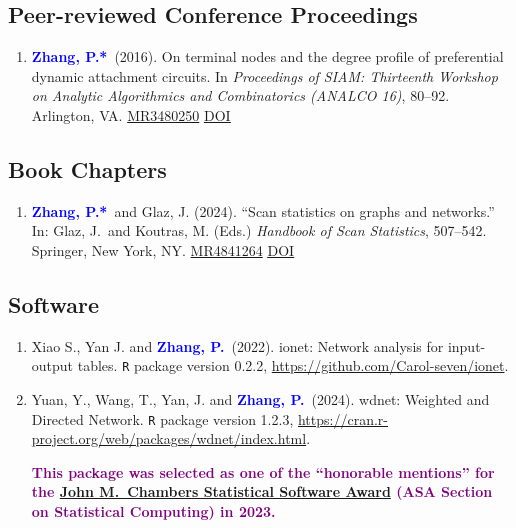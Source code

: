 \documentclass[12pt]{article}
\def \MR #1{\href{http://www.ams.org/mathscinet-getitem?mr=#1}{MR#1}}
\def \DOI #1{\href{http://doi.org/#1}{\underline{DOI}}}
\newcommand{\PZ}{\textcolor{blue}{\textbf{Zhang, P.*}}}
\newcommand{\PZnot}{\textcolor{blue}{\textbf{Zhang, P.}}}
\newcommand{\purple}[1]{\textcolor{purple}{#1}}
\begin{document}
	\subsection*{Peer-reviewed Conference Proceedings}
	\begin{enumerate}
		\item \PZ\ (2016). On terminal nodes and the degree 
		profile of preferential dynamic attachment circuits. In 
		\emph{Proceedings of SIAM: Thirteenth Workshop on Analytic 
		Algorithmics and Combinatorics (ANALCO 16)}, 80--92. 
		Arlington, VA. \MR{3480250} \DOI{10.1137/1.9781611974324.9}
	\end{enumerate}
	
	\subsection*{Book Chapters}
	\begin{enumerate}
		\item \PZ\ and {\sc Glaz, J.} (2024). ``Scan 
		statistics on graphs and networks.'' In: Glaz, J.\ and 
		Koutras, M. (Eds.) {\em Handbook of Scan Statistics}, 
		507--542. Springer, New York, NY. 
		\MR{4841264} \DOI{10.1007/978-1-4614-8033-4_43}	
	\end{enumerate}
	
	\subsection*{Software}
	\begin{enumerate}
		\item{\sc Xiao S., Yan J.} and \PZnot\ (2022).
		ionet: Network analysis for input-output tables. {\tt R} 
		package version 0.2.2, 
		\url{https://github.com/Carol-seven/ionet}.
		
		\item {\sc Yuan, Y., Wang, T., Yan, J.} and \PZnot\ (2024). 
		wdnet: Weighted and Directed Network. {\tt R} package 
		version 
		1.2.3, 
		\url{https://cran.r-project.org/web/packages/wdnet/index.html}.
		
		\purple{\bf This package was selected as one of the 
		``honorable mentions'' for the  
		\href{https://community.amstat.org/jointscsg-section/awards/john-m-chambers}{John
		 M.\ Chambers Statistical Software Award} (ASA Section on 
		 Statistical Computing) in 2023.}
	\end{enumerate}
	
\end{document}
